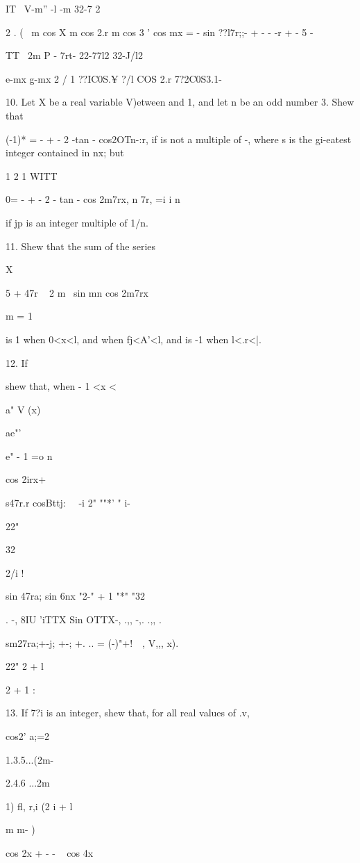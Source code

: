 {IT \ V-m'' -l -m 32-7 2

2 . ( \ m cos X m cos 2.r m cos 3 ' cos mx = - sin ??l7r;;- + - - -r
+ - 5 -

TT \ 2m P - 7rt- 22-77l2 32-J/l2

e-mx g-mx 2 / 1 ??IC0S.¥ ?/l COS 2.r 7?2C0S3.1- \

10. Let X be a real variable V)etween and 1, and let n be an odd
number 3. Shew that

(-1)* = - + - 2 -tan - cos2OTn-:r, if is not a multiple of -, where s
is the gi-eatest integer contained in nx; but

 1 2 1 WITT

0= - + - 2 - tan - cos 2m7rx, n 7r, =i i n

if jp is an integer multiple of 1/n. 

11. Shew that the sum of the series

X

 5 + 47r ~ 2 m~ sin mn cos 2m7rx

m = 1

is 1 when 0<x<l, and when fj<A'<l, and is -1 when l<.r<|.

12. If

shew that, when - 1 <x <\,

a" V (x)

ae"'

e" - 1 =o n

cos 2irx+

s47r.r cosBttj: \ \ -i 2" ""*' " i-

22"

32

2/i !

sin 47ra; sin 6nx "2-" + 1 "*" "32

. -, 8IU 'iTTX Sin OTTX-, .,, -,. .,, .

sm27ra;+-j; +-; +. .. = (-)"+! \ \,, V,,, x).

22" 2 + l

2 + 1 :


13. If 7?i is an integer, shew that, for all real values of .v,

cos2' a;=2

1.3.5...(2m-

2.4.6 ...2m

1) fl, r,i (2 i + l

m m- )

cos 2x + - - ~ cos 4x

}
